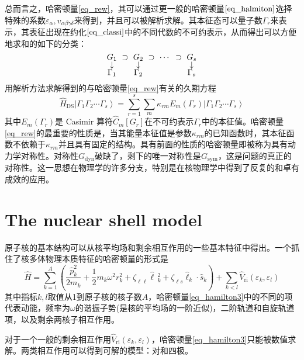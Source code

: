 总而言之，哈密顿量\ref{eq_rew}，其可以通过更一般的哈密顿量$\ref{eq_halmiton}$选择特殊的系数$\varepsilon_\alpha,v_{\alpha\beta\gamma\delta}$来得到，并且可以被解析求解。其本征态可以量子数$\Gamma_r$来表示，其表征出现在约化$\ref{eq_classi}$中的不同代数的不可约表示，从而得出可以方便地求和的如下的分类：
\begin{equation*}
{\setlength\arraycolsep{3pt}\renewcommand{\arraystretch}{0.7}
\begin{array}{ccccccc}
G_1&\supset&G_2&\supset&\cdots&\supset&G_s\\
\downarrow& &\downarrow& & & &\downarrow\\
\Gamma_1& &\Gamma_2& & & &\Gamma_s
\end{array}}
\end{equation*}
用解析方法求解得到的与哈密顿量\ref{eq_rew}有关的久期方程
\begin{equation*}
\hat{H}_\textrm{DS}\left|\Gamma_1\Gamma_2\cdots\Gamma_s\right>=\sum_{r=1}^s\sum_m\kappa_{rm}E_m(\Gamma_r)\left|\Gamma_1\Gamma_2\cdots\Gamma_s\right>
\end{equation*}
其中$E_m(\Gamma_r)$是 Casimir 算符$\hat{C}_m[G_r]$在不可约表示$\Gamma_r$中的本征值。哈密顿量\ref{eq_rew}的最重要的性质是，当其能量本征值是参数$\kappa_{rm}$的已知函数时，其本征函数不依赖于$\kappa_{rm}$并且具有固定的结构。具有前面的性质的哈密顿量即被称为具有动力学对称性。对称性$G_\textrm{dyn}$破缺了，剩下的唯一对称性是$G_\textrm{sym}$，这是问题的真正的对称性。这一思想在物理学的许多分支，特别是在核物理学中得到了反复的和卓有成效的应用。
\section{The nuclear shell model}
原子核的基本结构可以从核平均场和剩余相互作用的一些基本特征中得出。一个抓住了核多体物理本质特征的哈密顿量的形式是
\begin{equation}\label{eq_hamilton3}
\hat{H}=\sum_{k=1}^A\left(\frac{\hat{p}_k^2}{2m_k}+\frac{1}{2}m_k\omega^2r_k^2+\zeta_{\ell\ell}\hat{\ell}\,_k^2+\zeta_{\ell s}\hat{\ell}_k\cdot\hat{s}_k\right)+\sum_{k<l}\hat{V}_\textrm{ri}(\varepsilon_k,\varepsilon_l)
\end{equation}
其中指标$k,l$取值从1到原子核的核子数$A$，哈密顿量\ref{eq_hamilton3}中的不同的项代表动能，频率为$\omega$的谐振子势(是核的平均场的一阶近似)，二阶轨道和自旋轨道项，以及剩余两核子相互作用。

对于一个一般的剩余相互作用$\hat{V}_\textrm{ri}(\varepsilon_k,\varepsilon_l)$，哈密顿量\ref{eq_hamilton3}只能被数值求解。两类相互作用可以得到可解的模型：对和四极。

